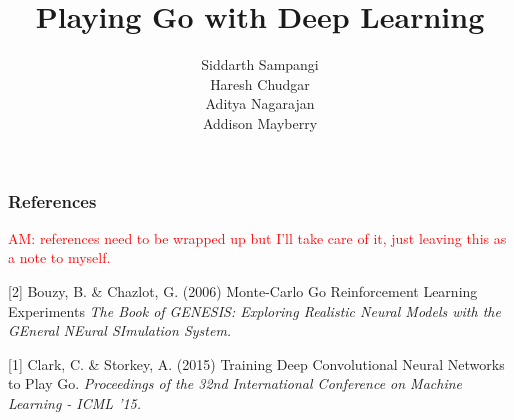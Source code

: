 \documentclass{article} %
\title{Playing Go with Deep Learning}
\author{
Siddarth Sampangi \\
\And
Haresh Chudgar \\
\AND
Aditya Nagarajan \\
\And
Addison Mayberry \\
}
\begin{document}
\maketitle









\subsubsection*{References}

\textcolor{red}{AM: references need to be wrapped up but I'll take care of it, just leaving this as a note to myself.}

\small{
[2] Bouzy, B. \& Chazlot, G. (2006) Monte-Carlo Go Reinforcement Learning Experiments {\it The Book of GENESIS: Exploring
Realistic Neural Models with the GEneral NEural SImulation System.}

[1] Clark, C. \& Storkey, A. (2015) Training Deep Convolutional Neural Networks to Play Go. {\it Proceedings of the 32nd International Conference on Machine Learning - ICML '15.}
}
\end{document}

